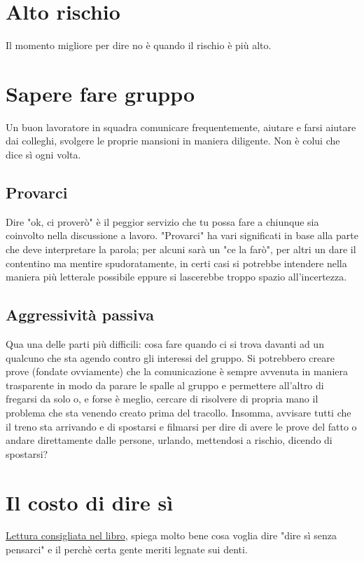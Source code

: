 \documentclass[11pt,a4paper]{book}
\begin{document}
\section{Alto rischio}
Il momento migliore per dire no è quando il rischio è più alto.

\section{Sapere fare gruppo}
Un buon lavoratore in squadra comunicare frequentemente, aiutare e farsi aiutare dai colleghi, svolgere le proprie mansioni in maniera diligente. Non è colui che dice sì ogni volta.

\subsection{Provarci}
Dire "ok, ci proverò" è il peggior servizio che tu possa fare a chiunque sia coinvolto nella discussione a lavoro. "Provarci" ha vari significati in base alla parte che deve interpretare la parola; per alcuni sarà un "ce la farò", per altri un dare il contentino ma mentire spudoratamente, in certi casi si potrebbe intendere nella maniera più letterale possibile eppure si lascerebbe troppo spazio all'incertezza.

\subsection{Aggressività passiva}
Qua una delle parti più difficili: cosa fare quando ci si trova davanti ad un qualcuno che sta agendo contro gli interessi del gruppo. Si potrebbero creare prove (fondate ovviamente) che la comunicazione è sempre avvenuta in maniera trasparente in modo da parare le spalle al gruppo e permettere all'altro di fregarsi da solo o, e forse è meglio, cercare di risolvere di propria mano il problema che sta venendo creato prima del tracollo. Insomma, avvisare tutti che il treno sta arrivando e di spostarsi e filmarsi per dire di avere le prove del fatto o andare direttamente dalle persone, urlando, mettendosi a rischio, dicendo di spostarsi?

\section{Il costo di dire sì}
\href{http://raptureinvenice.com/?p=63}{Lettura consigliata nel libro}, spiega molto bene cosa voglia dire "dire sì senza pensarci" e il perchè certa gente meriti legnate sui denti.
\end{document}
